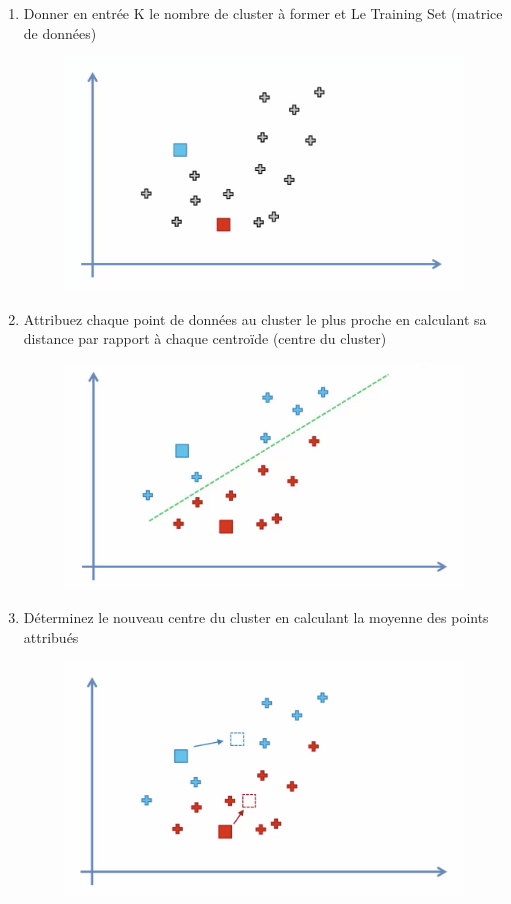 \documentclass[12pt, openany]{report}
\begin{document}
\begin{enumerate}
    \item Donner en entrée K le nombre de cluster à former et Le Training Set (matrice de données)
        \begin{figure}[ht]
        \centering
        \includegraphics[scale=0.2]{algo1.png}
        \end{figure}
    \item Attribuez chaque point de données au cluster le plus proche en calculant sa distance par rapport à chaque centroïde (centre du cluster)
        \begin{figure}[H]
        \centering
        \includegraphics[scale=0.2]{algo2.png}
        \end{figure}
    \item Déterminez le nouveau centre du cluster en calculant la moyenne des points attribués
        \begin{figure}[H]
        \centering
        \includegraphics[scale=0.2]{algo3.png}

\end{figure}
\end{enumerate}
\end{document}
